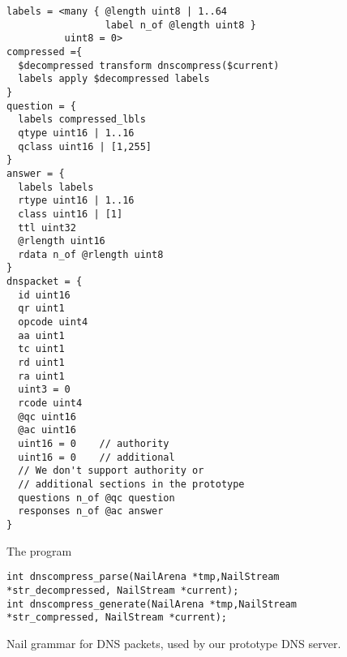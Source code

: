 \begin{figure}
\begin{verbatim}
labels = <many { @length uint8 | 1..64
                 label n_of @length uint8 }
          uint8 = 0>
compressed ={
  $decompressed transform dnscompress($current)
  labels apply $decompressed labels
}
question = {
  labels compressed_lbls
  qtype uint16 | 1..16
  qclass uint16 | [1,255]
}
answer = {
  labels labels
  rtype uint16 | 1..16
  class uint16 | [1]
  ttl uint32
  @rlength uint16
  rdata n_of @rlength uint8
}
dnspacket = {
  id uint16
  qr uint1
  opcode uint4
  aa uint1
  tc uint1
  rd uint1
  ra uint1
  uint3 = 0
  rcode uint4
  @qc uint16
  @ac uint16
  uint16 = 0    // authority
  uint16 = 0    // additional
  // We don't support authority or
  // additional sections in the prototype
  questions n_of @qc question
  responses n_of @ac answer
}
\end{verbatim}
The program
\begin{verbatim}
int dnscompress_parse(NailArena *tmp,NailStream *str_decompressed, NailStream *current);
int dnscompress_generate(NailArena *tmp,NailStream *str_compressed, NailStream *current);
\end{verbatim}
\caption{Nail grammar for DNS packets, used by our prototype DNS server.}
\label{fig:dns-full}
\end{figure}

